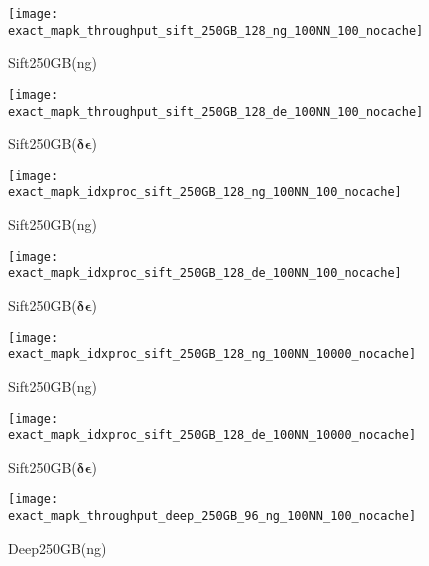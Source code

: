 {{\begin{figure*}[tb]
\begin{subfigure}{0.16\textwidth}
		\label{fig:approx:accuracy:efficiency:synthetic:250GB:256:de:hdd:100NN:10K:nocache}
	\end{subfigure}
	\begin{subfigure}{0.16\textwidth}
		\centering
		\texttt{[image: exact\_mapk\_throughput\_sift\_250GB\_128\_ng\_100NN\_100\_nocache]}
		\scriptsize \caption{Sift250GB(ng)} 
		\label{fig:approx:accuracy:qefficiency:sift:250GB:ng:hdd:100NN:100:nocache}
	\end{subfigure}
	\begin{subfigure}{0.16\textwidth}
		\centering
		\texttt{[image: exact\_mapk\_throughput\_sift\_250GB\_128\_de\_100NN\_100\_nocache]}
		\scriptsize \caption{Sift250GB($\bm{\delta\epsilon}$)} 
		\label{fig:approx:accuracy:qefficiency:sift:250GB:de:hdd:100NN:100:nocache}
	\end{subfigure}
	\begin{subfigure}{0.16\textwidth}
		\centering
		\texttt{[image: exact\_mapk\_idxproc\_sift\_250GB\_128\_ng\_100NN\_100\_nocache]}
		\scriptsize \caption{Sift250GB(ng)} 
		\label{fig:approx:accuracy:efficiency:sift:250GB:ng:hdd:100NN:100:nocache}
	\end{subfigure}
	\begin{subfigure}{0.16\textwidth}
		\centering
		\texttt{[image: exact\_mapk\_idxproc\_sift\_250GB\_128\_de\_100NN\_100\_nocache]}
		\scriptsize \caption{Sift250GB($\bm{\delta\epsilon}$)} 
		\label{fig:approx:accuracy:efficiency:sift:250GB:de:hdd:100NN:100:nocache}
	\end{subfigure}
	\begin{subfigure}{0.16\textwidth}
		\centering
		\texttt{[image: exact\_mapk\_idxproc\_sift\_250GB\_128\_ng\_100NN\_10000\_nocache]}
		\scriptsize \caption{Sift250GB(ng)} 
		\label{fig:approx:accuracy:efficiency:sift:250GB:ng:hdd:100NN:10K:nocache}
	\end{subfigure}
	\begin{subfigure}{0.16\textwidth}
		\centering
		\texttt{[image: exact\_mapk\_idxproc\_sift\_250GB\_128\_de\_100NN\_10000\_nocache]}
		\scriptsize \caption{Sift250GB($\bm{\delta\epsilon}$)} 
		\label{fig:approx:accuracy:efficiency:sift:250GB:de:hdd:100NN:10K:nocache}
	\end{subfigure}	
	\begin{subfigure}{0.16\textwidth}
		\centering
		\texttt{[image: exact\_mapk\_throughput\_deep\_250GB\_96\_ng\_100NN\_100\_nocache]}
		\scriptsize \caption{Deep250GB(ng)} 
		\label{fig:approx:accuracy:qefficiency:deep:250GB:96:hdd:ng:100NN:100:nocache}

\end{subfigure}
\end{figure*}}}
